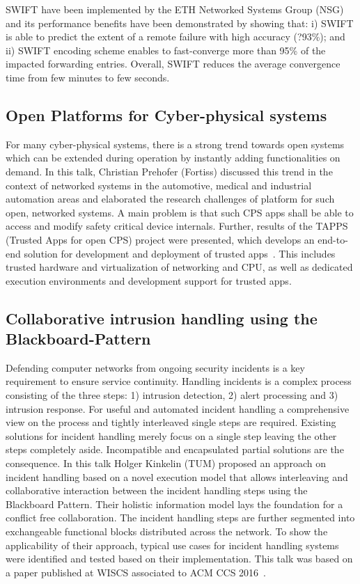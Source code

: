 SWIFT have been implemented by the ETH Networked Systems Group (NSG) and its
performance benefits have been demonstrated by showing that: i) SWIFT is able
to predict the extent of a remote failure with high accuracy (?93\%); and ii)
SWIFT encoding scheme enables to fast-converge more than 95\% of the impacted
forwarding entries. Overall, SWIFT reduces the average convergence time from
few minutes to few seconds.


\subsection{Open Platforms for Cyber-physical systems}

For many cyber-physical systems, there is a strong trend towards open systems
which can be extended during operation by instantly adding functionalities on
demand. In this talk, Christian Prehofer (Fortiss) discussed this trend in the
context of networked systems in the automotive, medical and industrial
automation areas and elaborated the research challenges of platform for such
open, networked systems. A main problem is that such CPS apps shall be able to
access and modify safety critical device internals. Further, results of the
TAPPS (Trusted Apps for open CPS) project were presented, which  develops an
end-to-end solution for development and deployment of trusted
apps~\cite{Prehofer2016}. This includes trusted hardware and virtualization of
networking and CPU, as well as dedicated execution environments and
development support for trusted apps.


\subsection{Collaborative intrusion handling using the Blackboard-Pattern}

Defending computer networks from ongoing security incidents is a key
requirement to ensure service continuity. Handling incidents is a complex
process consisting of the three steps: 1) intrusion detection, 2) alert
processing and 3) intrusion response. For useful and automated incident
handling a comprehensive view on the process and tightly interleaved single
steps are required. Existing solutions for incident handling merely focus on a
single step leaving the other steps completely aside. Incompatible and
encapsulated partial solutions are the consequence. In this talk Holger
Kinkelin (TUM) proposed an approach on incident handling based on a novel
execution model that allows interleaving and collaborative interaction between
the incident handling steps using the Blackboard Pattern. Their holistic
information model lays the foundation for a conflict free collaboration. The
incident handling steps are further segmented into exchangeable functional
blocks distributed across the network. To show the applicability of their
approach, typical use cases for incident handling systems were identified and
tested based on their implementation. This talk was based on a paper published
at WISCS associated to ACM CCS 2016~\cite{Herold2016}.
